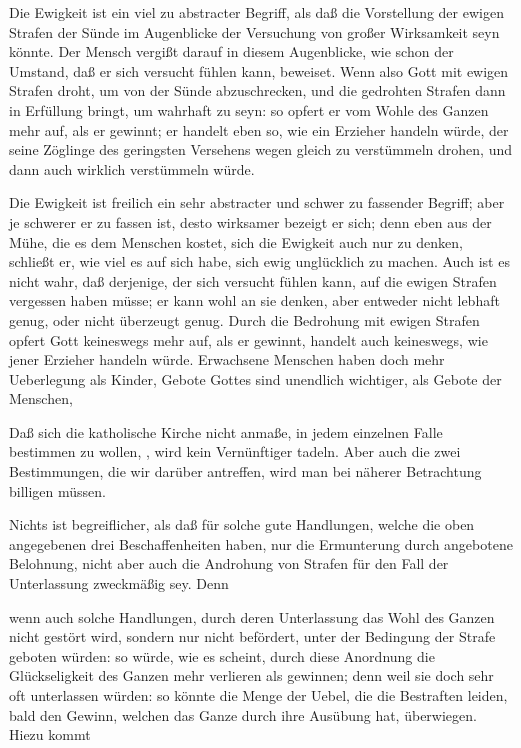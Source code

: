 \begin{aufza}
\begin{aufzb}
\begin{aufzc}
\item {} Die Ewigkeit ist ein viel zu abstracter Begriff, als daß die Vorstellung der ewigen Strafen der Sünde im Augenblicke der Versuchung von großer Wirksamkeit seyn könnte. Der Mensch vergißt darauf in diesem Augenblicke, wie schon der Umstand, daß er sich versucht fühlen kann, beweiset. Wenn also Gott mit ewigen Strafen droht, um von der Sünde abzuschrecken, und die gedrohten Strafen dann in Erfüllung bringt, um wahrhaft zu seyn: so opfert er vom Wohle des Ganzen mehr auf, als er gewinnt; er handelt eben so, wie ein Erzieher handeln würde, der seine Zöglinge des geringsten Versehens wegen gleich zu verstümmeln drohen, und dann auch wirklich verstümmeln würde.\par
{} Die Ewigkeit ist freilich ein sehr abstracter und schwer zu fassender Begriff; aber je schwerer er zu fassen ist, desto wirksamer bezeigt er sich; denn eben aus der Mühe, die es dem Menschen kostet, sich die Ewigkeit auch nur zu denken, schließt er, wie viel es auf sich habe, sich ewig unglücklich zu machen. Auch ist es nicht wahr, daß derjenige, der sich versucht fühlen kann, auf die ewigen Strafen vergessen haben müsse; er kann wohl an sie denken, aber entweder nicht lebhaft genug, oder nicht überzeugt genug. Durch die Bedrohung mit ewigen Strafen opfert Gott keineswegs mehr auf, als er gewinnt, handelt auch keineswegs, wie jener Erzieher handeln würde. Erwachsene Menschen haben doch mehr Ueberlegung als Kinder, Gebote Gottes sind unendlich wichtiger, als Gebote der Menschen, \usw\
\end{aufzc}
\end{aufzb}
\item Daß sich die katholische Kirche nicht anmaße, in jedem einzelnen Falle bestimmen zu wollen, , wird kein Vernünftiger tadeln. Aber auch die zwei Bestimmungen, die wir darüber antreffen, wird man bei näherer Betrachtung billigen müssen.~
\begin{aufzb}
\item Nichts ist begreiflicher, als daß für solche gute Handlungen, welche die oben angegebenen drei Beschaffenheiten haben, nur die Ermunterung durch angebotene Belohnung, nicht aber auch die Androhung von Strafen für den Fall der Unterlassung zweckmäßig sey. Denn
\begin{aufzc}
\item wenn auch solche Handlungen, durch deren Unterlassung das Wohl des Ganzen nicht gestört wird, sondern nur nicht befördert, unter der Bedingung der Strafe geboten würden: so würde, wie es scheint, durch diese Anordnung die Glückseligkeit des Ganzen mehr verlieren als gewinnen; denn weil sie doch sehr oft unterlassen würden: so könnte die Menge der Uebel, die die Bestraften leiden, bald den Gewinn, welchen das Ganze durch ihre Ausübung hat, überwiegen. Hiezu kommt

\end{aufzc}
\end{aufzb}
\end{aufza}
